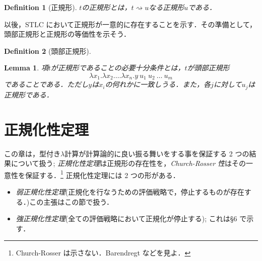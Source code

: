 \documentclass[a4paper,10pt,platex, dvipdfmx]{jsarticle}
\newtheorem{definition}{Definition}
\newtheorem{lemma}{Lemma}
\begin{document}
\begin{definition}[正規形]
    $t$の正規形とは，$t\rightsquigarrow u$なる正規形$u$である．
\end{definition}
以後，STLC において正規形が一意的に存在することを示す．その準備として，頭部正規形と正規形の等価性を示そう．
\begin{definition}[頭部正規形]

\end{definition}
\begin{lemma}
項$t$が正規形であることの必要十分条件とは，$t$が\emph{頭部正規形}\begin{equation}
    \lambda x_{1}.\lambda x_{2}.\ldots \lambda x_{n}. y\ u_{1}\ u_{2}\ \ldots\ u_{m}
\end{equation}であることである．ただし$y$は$x_{i}$の何れかに一致しうる．また，各$j$に対して$u_{j}$は正規形である．
\end{lemma}
\section{正規化性定理}
この章は，型付き$\lambda$計算が計算論的に良い振る舞いをする事を保証する 2 つの結果について扱う; \emph{正規化性定理}は正規形の存在性を，\emph{Church-Rosser 性}はその一意性を保証する．\footnote{Church-Rosser は示さない．Barendregt などを見よ．}
正規化性定理には 2 つの形がある．\begin{itemize}
\item \emph{弱正規化性定理}(正規化を行なうための評価戦略で，停止するものが存在する．)この主張はこの節で扱う．
\item \emph{強正規化性定理}(全ての評価戦略において正規化が停止する); これは\S6 で示す．
\end{itemize}
\end{document}
